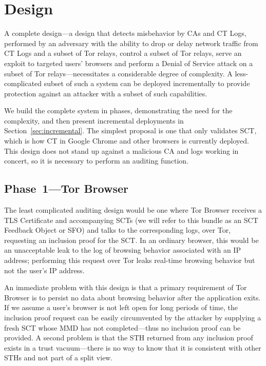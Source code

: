 \section{Design} \label{sec:base}

A complete design---a design that detects misbehavior by CAs and CT Logs, performed by an adversary with the ability to drop or delay network traffic from CT Logs and a subset of Tor relays, control a subset of Tor relays, serve an exploit to targeted users' browsers and perform a Denial of Service attack on a subset of Tor relays---necessitates a considerable degree of complexity. A less-complicated subset of such a system can be deployed incrementally to provide protection against an attacker with a subset of such capabilities.

We build the complete system in phases, demonstrating the need for the complexity, and then present incremental deployments in Section~\ref{sec:incremental}. The simplest proposal is one that only validates SCT, which is how CT in Google Chrome and other browsers is currently deployed. This design does not stand up against a malicious CA and logs working in concert, so it is necessary to perform an auditing function.

\subsection{Phase~1---Tor Browser} \label{sec:base:phase1}

The least complicated auditing design would be one where Tor Browser receives a TLS Certificate and accompanying SCTs (we will refer to this bundle as an SCT Feedback Object or SFO) and talks to the corresponding logs, over Tor, requesting an inclusion proof for the SCT. In an ordinary browser, this would be an unacceptable leak to the log of browsing behavior associated with an IP address; performing this request over Tor leaks real-time browsing behavior but not the user's IP address.

An immediate problem with this design is that a primary requirement of Tor Browser is to persist no data about browsing behavior after the application exits. If we assume a user's browser is not left open for long periods of time, the inclusion proof request can be easily circumvented by the attacker by supplying a fresh SCT whose MMD has not completed---thus no inclusion proof can be provided. A second problem is that the STH returned from any inclusion proof exists in a trust vacuum---there is no way to know that it is consistent with other STHs and not part of a split view.

